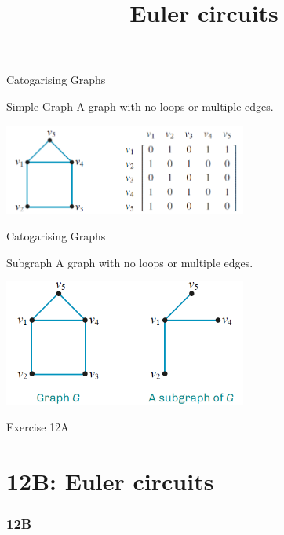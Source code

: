 \documentclass[
	11pt, %
]{beamer}
\begin{document}
\begin{frame}{Catogarising Graphs}
    \begin{block}{Simple Graph}
        A graph with no loops or multiple edges.\\
        \begin{center}
            \includegraphics[width = 8cm]{Graph8.png}
        \end{center}
    \end{block}
\end{frame}

\begin{frame}{Catogarising Graphs}
    \begin{block}{Subgraph}
        A graph with no loops or multiple edges.\\
        \begin{center}
            \includegraphics[width = 8cm]{Graph9.png}
        \end{center}
    \end{block}
\end{frame}

\begin{frame}{Exercise 12A}
\end{frame}

\section{12B: Euler circuits}
\begin{frame}
    \frametitle{12B}
    \begin{center}
        \title{Euler circuits}
        \maketitle
    \end{center}
\end{frame}
\end{document}
